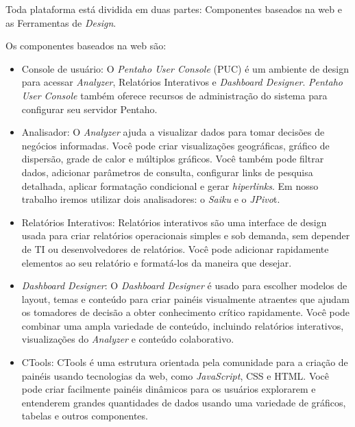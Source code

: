 Toda plataforma est\'{a} dividida em duas partes: Componentes baseados na web e as Ferramentas de \textit{Design}.

Os componentes baseados na web s\~{a}o:

\begin{itemize}
    \item Console de usu\'{a}rio: O \textit{Pentaho User Console} (PUC) \'{e} um ambiente de design para acessar \textit{Analyzer}, Relat\'orios Interativos e \textit{Dashboard Designer}. \textit{Pentaho User Console} tamb\'{e}m oferece recursos de administra\c{c}\~{a}o do sistema para configurar seu servidor Pentaho.
    
    \item Analisador: O \textit{Analyzer} ajuda a visualizar dados para tomar decis\~{o}es de neg\'ocios informadas. Você pode criar visualiza\c{c}\~{o}es geogr\'{a}ficas, gr\'{a}fico de dispers\~{a}o, grade de calor e múltiplos gr\'{a}ficos. Você tamb\'{e}m pode filtrar dados, adicionar parâmetros de consulta, configurar links de pesquisa detalhada, aplicar formata\c{c}\~{a}o condicional e gerar \textit{hiperlinks}. Em nosso trabalho iremos utilizar dois analisadores: o \textit{Saiku} e o \textit{JPivo}t.
    
    \item Relat\'orios Interativos: Relat\'orios interativos s\~{a}o uma interface de design usada para criar relat\'orios operacionais simples e sob demanda, sem depender de TI ou desenvolvedores de relat\'orios. Você pode adicionar rapidamente elementos ao seu relat\'orio e format\'{a}-los da maneira que desejar.
    
    \item \textit{Dashboard Designer}: O \textit{Dashboard Designer} \'{e} usado para escolher modelos de layout, temas e conteúdo para criar pain\'{e}is visualmente atraentes que ajudam os tomadores de decis\~{a}o a obter conhecimento cr\'{i}tico rapidamente. Você pode combinar uma ampla variedade de conteúdo, incluindo relat\'orios interativos, visualiza\c{c}\~{o}es do \textit{Analyzer} e conteúdo colaborativo.
    
    \item CTools: CTools \'{e} uma estrutura orientada pela comunidade para a cria\c{c}\~{a}o de pain\'{e}is usando tecnologias da web, como \textit{JavaScript}, CSS e HTML. Você pode criar facilmente pain\'{e}is dinâmicos para os usu\'{a}rios explorarem e entenderem grandes quantidades de dados usando uma variedade de gr\'{a}ficos, tabelas e outros componentes.
    

\end{itemize}
